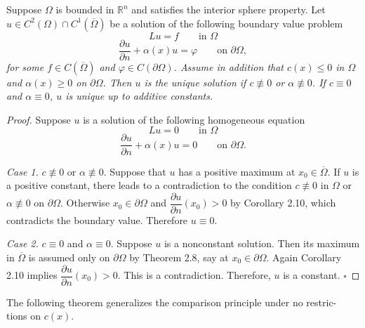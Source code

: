 \begin{corollary}\label{hanlin:maxprin-cor-2-11}
Suppose $\Omega$ is bounded in $\mathbb{R}^n$ and satisfies the interior sphere
property. Let $u \in C^2(\Omega) \cap C^1(\overline{\Omega})$ be a solution of the following boundary value
problem
\[
Lu=f \qquad \text{in } \Omega
\]
\[
\frac{\partial u}{\partial n}+\alpha(x)u=\varphi \qquad \text{on } \partial\Omega,
\]
\textit{for some $f \in C(\overline{\Omega})$ and $\varphi \in C(\partial\Omega)$. Assume in addition that $c(x)\le 0$ in $\Omega$ and
$\alpha(x)\ge 0$ on $\partial\Omega$. Then $u$ is the unique solution if $c\not\equiv 0$ or $\alpha\not\equiv 0$. If $c\equiv 0$ and
$\alpha\equiv 0$, $u$ is unique up to additive constants.}
\end{corollary}
\begin{proof}
\sketch
Suppose $u$ is a solution of the following homogeneous equation
\[
Lu=0 \qquad \text{in } \Omega
\]
\[
\frac{\partial u}{\partial n}+\alpha(x)u=0 \qquad \text{on } \partial\Omega.
\]

\textit{Case 1.} $c \not\equiv 0$ or $\alpha \not\equiv 0$. Suppose that $u$ has a positive maximum at $x_0 \in \overline{\Omega}$.
If $u$ is a positive constant, there leads to a contradiction to the condition $c\not\equiv 0$ in
$\Omega$ or $\alpha\not\equiv 0$ on $\partial\Omega$. Otherwise $x_0 \in \partial\Omega$ and $\dfrac{\partial u}{\partial n}(x_0)>0$ by Corollary 2.10, which
contradicts the boundary value. Therefore $u \equiv 0$.

\textit{Case 2.} $c \equiv 0$ and $\alpha \equiv 0$. Suppose $u$ is a nonconstant solution. Then its
maximum in $\overline{\Omega}$ is assumed only on $\partial\Omega$ by Theorem 2.8, say at $x_0 \in \partial\Omega$. Again
Corollary 2.10 implies $\dfrac{\partial u}{\partial n}(x_0)>0$. This is a contradiction. Therefore, $u$ is a
constant. $\square$
\end{proof}

The following theorem generalizes the comparison principle under no restric-
tions on $c(x)$.

